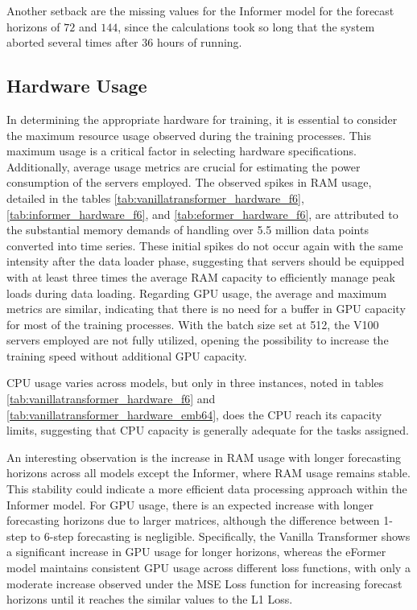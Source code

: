 \documentclass{article}
\begin{document}
Another setback are the missing values for the Informer model for the forecast horizons of $72$ and $144$, since the calculations took so long that the system aborted several times after 36 hours of running. 

\subsection{Hardware Usage}

In determining the appropriate hardware for training, it is essential to consider the maximum resource usage observed during the training processes. This maximum usage is a critical factor in selecting hardware specifications. Additionally, average usage metrics are crucial for estimating the power consumption of the servers employed. The observed spikes in RAM usage, detailed in the tables \ref{tab:vanillatransformer_hardware_f6}, \ref{tab:informer_hardware_f6}, and \ref{tab:eformer_hardware_f6}, are attributed to the substantial memory demands of handling over 5.5 million data points converted into time series. These initial spikes do not occur again with the same intensity after the data loader phase, suggesting that servers should be equipped with at least three times the average RAM capacity to efficiently manage peak loads during data loading. Regarding GPU usage, the average and maximum metrics are similar, indicating that there is no need for a buffer in GPU capacity for most of the training processes. With the batch size set at 512, the V100 servers employed are not fully utilized, opening the possibility to increase the training speed without additional GPU capacity.

CPU usage varies across models, but only in three instances, noted in tables \ref{tab:vanillatransformer_hardware_f6} and \ref{tab:vanillatransformer_hardware_emb64}, does the CPU reach its capacity limits, suggesting that CPU capacity is generally adequate for the tasks assigned.

An interesting observation is the increase in RAM usage with longer forecasting horizons across all models except the Informer, where RAM usage remains stable. This stability could indicate a more efficient data processing approach within the Informer model. For GPU usage, there is an expected increase with longer forecasting horizons due to larger matrices, although the difference between 1-step to 6-step forecasting is negligible. Specifically, the Vanilla Transformer shows a significant increase in GPU usage for longer horizons, whereas the eFormer model maintains consistent GPU usage across different loss functions, with only a moderate increase observed under the MSE Loss function for increasing forecast horizons until it reaches the similar values to the L1 Loss.
\end{document}
